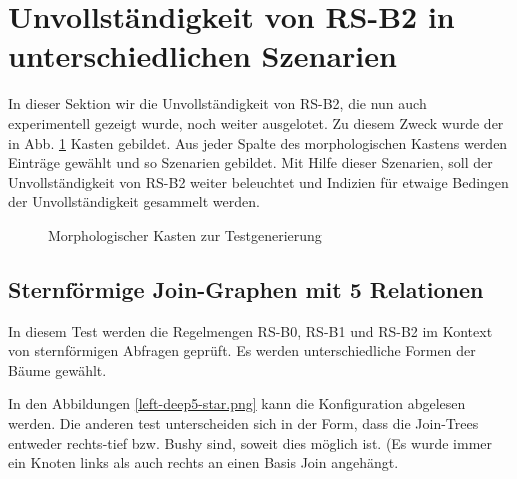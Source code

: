\section{Unvollständigkeit von RS-B2 in unterschiedlichen Szenarien}

In dieser Sektion wir die Unvollständigkeit von RS-B2, die nun auch experimentell gezeigt wurde, noch weiter ausgelotet. Zu diesem Zweck wurde der in Abb. \ref{Morphologischer} Kasten gebildet. Aus jeder Spalte des morphologischen Kastens werden Einträge gewählt und so Szenarien gebildet. Mit Hilfe dieser Szenarien, soll der Unvollständigkeit von RS-B2 weiter beleuchtet und Indizien für etwaige Bedingen der Unvollständigkeit gesammelt werden.


\begin{figure}[ht]
\centering
{}
\caption{Morphologischer Kasten zur Testgenerierung}
\label{Morphologischer}
\end{figure}


\subsection{Sternförmige Join-Graphen mit 5 Relationen}

In diesem Test werden die Regelmengen RS-B0, RS-B1 und RS-B2 im Kontext von sternförmigen Abfragen geprüft. Es werden unterschiedliche Formen der Bäume gewählt.

In den Abbildungen \ref{left-deep5-star.png} kann die Konfiguration abgelesen werden. Die anderen test unterscheiden sich in der Form, dass die Join-Trees entweder rechts-tief bzw. Bushy sind, soweit dies möglich ist. (Es wurde immer ein Knoten links als auch rechts an einen Basis Join angehängt.

